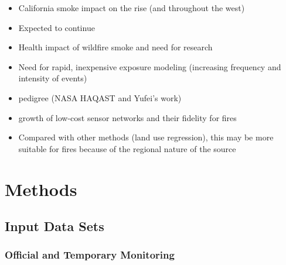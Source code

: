 \documentclass[gmd, manuscript]{copernicus}
\providecommand{\tightlist}{%
  \setlength{\itemsep}{0pt}\setlength{\parskip}{0pt}}
\begin{document}


\introduction[Introduction]

\begin{itemize}
\tightlist
\item
  California smoke impact on the rise (and throughout the west)
\item
  Expected to continue
\item
  Health impact of wildfire smoke and need for research
\item
  Need for rapid, inexpensive exposure modeling (increasing frequency
  and intensity of events)
\item
  pedigree (NASA HAQAST and Yufei's work)
\item
  growth of low-cost sensor networks and their fidelity for fires
\item
  Compared with other methods (land use regression), this may be more
  suitable for fires because of the regional nature of the source
\end{itemize}

\section{Methods}

\subsection{Input Data Sets}

\subsubsection{Official and Temporary Monitoring}
\end{document}
